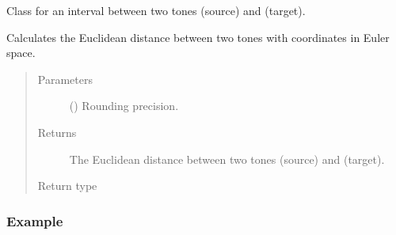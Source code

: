 \documentclass[letterpaper,10pt,english]{sphinxmanual}
\begin{document}
\begin{fulllineitems}
\label{\detokenize{api:musictheory.Interval}}
Class for an interval between two tones  (source) and  (target).

\begin{fulllineitems}
\label{\detokenize{api:musictheory.Interval.get_euclidean_distance}}
Calculates the Euclidean distance between two tones
with coordinates in Euler space.
\begin{quote}\begin{description}
\item[{Parameters}] \leavevmode
{} () \textendash{} Rounding precision.

\item[{Returns}] \leavevmode
The Euclidean distance between two tones  (source) and  (target).

\item[{Return type}] \leavevmode
{}

\end{description}\end{quote}
\subsubsection*{Example}

\begin{sphinxVerbatim}[commandchars=\\\{\}]
   
   
  
\end{sphinxVerbatim}


\end{fulllineitems}
\end{fulllineitems}
\end{document}
